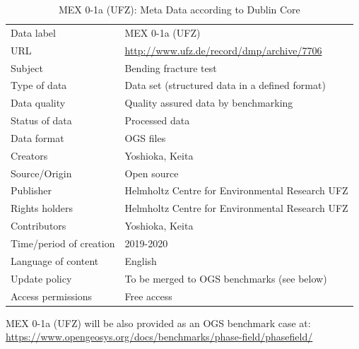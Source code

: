 \begin{table}[!ht]
\caption{MEX 0-1a (UFZ): Meta Data according to Dublin Core}
\label{tab:dms-mex0-1a-ufz}
\small
\begin{tabular}{R{3.5cm}|L{7.5cm}}
\hline
%
Data label & MEX 0-1a (UFZ) \\
URL & \url{http://www.ufz.de/record/dmp/archive/7706} \\ 
Subject  & Bending fracture test \\
Type of data  & Data set (structured data in a defined format) \\
Data quality  & Quality assured data by benchmarking \\
Status of data  & Processed data \\
Data format  & OGS files \\
Creators  & Yoshioka, Keita  \\
Source/Origin & Open source \\
Publisher  & Helmholtz Centre for Environmental Research UFZ \\
Rights holders & Helmholtz Centre for Environmental Research UFZ \\
Contributors & Yoshioka, Keita \\
Time/period of creation & 2019-2020 \\
Language of content & English \\
Update policy & To be merged to OGS benchmarks (see below) \\
Access permissions & Free access \\
%
\hline
\end{tabular}
\end{table}

MEX 0-1a (UFZ) will be also provided as an OGS benchmark case at:\\
\small
\url{https://www.opengeosys.org/docs/benchmarks/phase-field/phasefield/}
\normalsize



